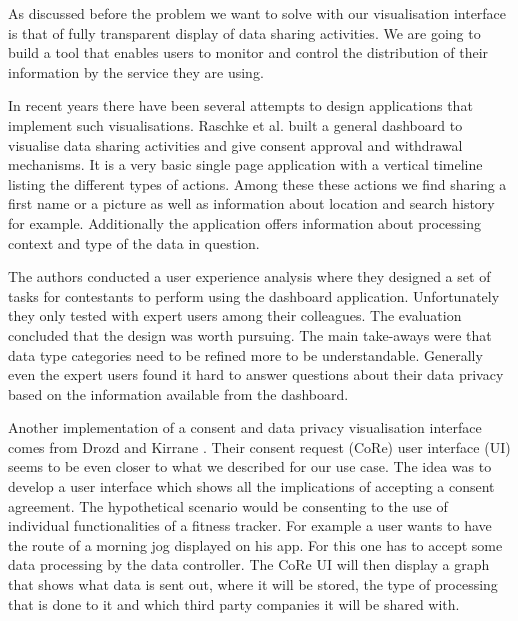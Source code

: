 
  As discussed before the problem we want to solve with our visualisation interface is that of fully transparent display of data sharing activities. We are going to build a tool that enables users to monitor and control the distribution of their information by the service they are using. 
  
  In recent years there have been several attempts to design applications that implement such visualisations. Raschke et al. \cite{core_privacy_dashboard_2018} built a general dashboard to visualise data sharing activities and give consent approval and withdrawal mechanisms. It is a very basic single page application with a vertical timeline listing the different types of actions. Among these these actions we find sharing a first name or a picture as well as information about location and search history for example. Additionally the application offers information about processing context and type of the data in question.
  
  The authors conducted a user experience analysis where they designed a set of tasks for contestants to perform using the dashboard application. Unfortunately they only tested with expert users among their colleagues. The evaluation concluded that the design was worth pursuing. The main take-aways were that data type categories need to be refined more to be understandable. Generally even the expert users found it hard to answer questions about their data privacy based on the information available from the dashboard.
  
  Another implementation of a consent and data privacy visualisation interface comes from Drozd and Kirrane \cite{cure2020}. Their consent request (CoRe) user interface (UI) seems to be even closer to what we described for our use case.
  The idea was to develop a user interface which shows all the implications of accepting a consent agreement. The hypothetical scenario would be consenting to the use of individual functionalities of a fitness tracker. For example a user wants to have the route of a morning jog displayed on his app. For this one has to accept some data processing by the data controller. The CoRe UI will then display a graph that shows what data is sent out, where it will be stored, the type of processing that is done to it and which third party companies it will be shared with.
  
